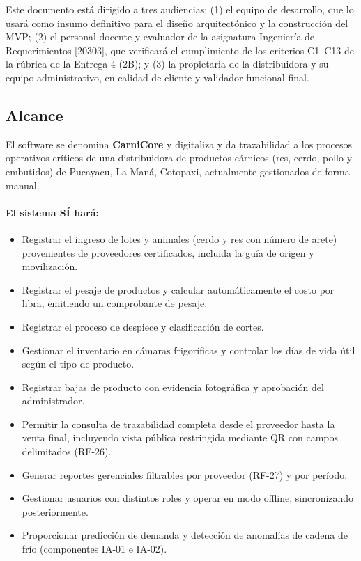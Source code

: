 \documentclass[11pt,a4paper]{article}
\begin{document}
Este documento está dirigido a tres audiencias: (1) el equipo de desarrollo, que lo usará como insumo definitivo para el diseño arquitectónico y la construcción del MVP; (2) el personal docente y evaluador de la asignatura Ingeniería de Requerimientos [20303], que verificará el cumplimiento de los criterios C1--C13 de la rúbrica de la Entrega 4 (2B); y (3) la propietaria de la distribuidora y su equipo administrativo, en calidad de cliente y validador funcional final.

\subsection{Alcance}

El software se denomina \textbf{CarniCore} y digitaliza y da trazabilidad a los procesos operativos críticos de una distribuidora de productos cárnicos (res, cerdo, pollo y embutidos) de Pucayacu, La Maná, Cotopaxi, actualmente gestionados de forma manual.

\paragraph{El sistema SÍ hará:}
\begin{itemize}[nosep]
\item Registrar el ingreso de lotes y animales (cerdo y res con número de arete) provenientes de proveedores certificados, incluida la guía de origen y movilización.
\item Registrar el pesaje de productos y calcular automáticamente el costo por libra, emitiendo un comprobante de pesaje.
\item Registrar el proceso de despiece y clasificación de cortes.
\item Gestionar el inventario en cámaras frigoríficas y controlar los días de vida útil según el tipo de producto.
\item Registrar bajas de producto con evidencia fotográfica y aprobación del administrador.
\item Permitir la consulta de trazabilidad completa desde el proveedor hasta la venta final, incluyendo vista pública restringida mediante QR con campos delimitados (RF-26).
\item Generar reportes gerenciales filtrables por proveedor (RF-27) y por período.
\item Gestionar usuarios con distintos roles y operar en modo offline, sincronizando posteriormente.
\item Proporcionar predicción de demanda y detección de anomalías de cadena de frío (componentes IA-01 e IA-02).
\end{itemize}
\end{document}
